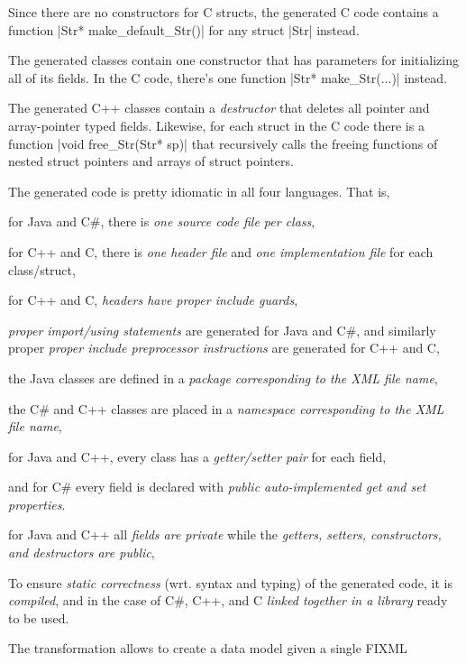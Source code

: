 \documentclass[a4paper]{article}
\begin{document}
\begin{compactenum}
  Since there are no constructors for C structs, the generated C code contains
  a function \cinline|Str* make_default_Str()| for any struct \cinline|Str|
  instead.
\item The generated classes contain one constructor that has parameters for
  initializing all of its fields.  In the C code, there's one function
  \cinline|Str* make_Str(...)| instead.
\item The generated C++ classes contain a \emph{destructor} that deletes all
  pointer and array-pointer typed fields.  Likewise, for each struct in the C
  code there is a function \cinline|void free_Str(Str* sp)| that recursively
  calls the freeing functions of nested struct pointers and arrays of struct
  pointers.
\item The generated code is pretty idiomatic in all four languages.  That is,
  \begin{compactitem}
  \item for Java and C\#, there is \emph{one source code file per class},
  \item for C++ and C, there is \emph{one header file} and \emph{one
      implementation file} for each class/struct,
  \item for C++ and C, \emph{headers have proper include guards},
  \item \emph{proper import/using statements} are generated for Java and C\#,
    and similarly proper \emph{proper include preprocessor instructions} are
    generated for C++ and C,
  \item the Java classes are defined in a \emph{package corresponding to the
      XML file name},
  \item the C\# and C++ classes are placed in a \emph{namespace corresponding
      to the XML file name},
  \item for Java and C++, every class has a \emph{getter/setter pair} for each
    field,
  \item and for C\# every field is declared with \emph{public auto-implemented
      get and set properties}.
  \item for Java and C++ all \emph{fields are private} while the \emph{getters,
      setters, constructors, and destructors are public},
  \end{compactitem}
\item To ensure \emph{static correctness} (wrt. syntax and typing) of the
  generated code, it is \emph{compiled}, and in the case of C\#, C++, and C
  \emph{linked together in a library} ready to be used.
\item The transformation allows to create a data model given a single FIXML

\end{compactenum}
\end{document}
